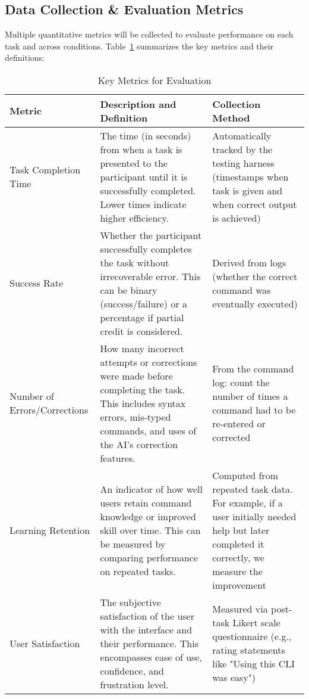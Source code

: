 \subsection{Data Collection \& Evaluation Metrics}

Multiple quantitative metrics will be collected to evaluate performance on each task and across conditions. Table~\ref{tab:metrics} summarizes the key metrics and their definitions:

\begin{table}[h]
	\centering
	\caption{Key Metrics for Evaluation}
	\label{tab:metrics}
	\begin{tabular}{|l|p{6cm}|p{4cm}|}
		\hline
		\textbf{Metric}              & \textbf{Description and Definition}                                                                                                                                         & \textbf{Collection Method}                                                                                                                  \\
		\hline
		Task Completion Time         & The time (in seconds) from when a task is presented to the participant until it is successfully completed. Lower times indicate higher efficiency.                          & Automatically tracked by the testing harness (timestamps when task is given and when correct output is achieved)                            \\
		\hline
		Success Rate                 & Whether the participant successfully completes the task without irrecoverable error. This can be binary (success/failure) or a percentage if partial credit is considered.  & Derived from logs (whether the correct command was eventually executed)                                                                     \\
		\hline
		Number of Errors/Corrections & How many incorrect attempts or corrections were made before completing the task. This includes syntax errors, mis-typed commands, and uses of the AI's correction features. & From the command log: count the number of times a command had to be re-entered or corrected                                                 \\
		\hline
		Learning Retention           & An indicator of how well users retain command knowledge or improved skill over time. This can be measured by comparing performance on repeated tasks.                       & Computed from repeated task data. For example, if a user initially needed help but later completed it correctly, we measure the improvement \\
		\hline
		User Satisfaction            & The subjective satisfaction of the user with the interface and their performance. This encompasses ease of use, confidence, and frustration level.                          & Measured via post-task Likert scale questionnaire (e.g., rating statements like "Using this CLI was easy")                                  \\
		\hline
	\end{tabular}
\end{table}

